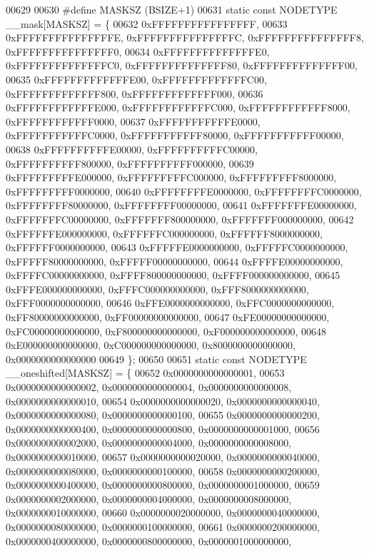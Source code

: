 \begin{DoxyCode}
00629 
00630 \textcolor{preprocessor}{#define MASKSZ (BSIZE+1)}
00631 \textcolor{keyword}{static} \textcolor{keyword}{const} NODETYPE \_\_mask[MASKSZ] = \{
00632         0xFFFFFFFFFFFFFFFF,
00633         0xFFFFFFFFFFFFFFFE, 0xFFFFFFFFFFFFFFFC, 0xFFFFFFFFFFFFFFF8, 0xFFFFFFFFFFFFFFF0,
00634         0xFFFFFFFFFFFFFFE0, 0xFFFFFFFFFFFFFFC0, 0xFFFFFFFFFFFFFF80, 0xFFFFFFFFFFFFFF00,
00635         0xFFFFFFFFFFFFFE00, 0xFFFFFFFFFFFFFC00, 0xFFFFFFFFFFFFF800, 0xFFFFFFFFFFFFF000,
00636         0xFFFFFFFFFFFFE000, 0xFFFFFFFFFFFFC000, 0xFFFFFFFFFFFF8000, 0xFFFFFFFFFFFF0000,
00637         0xFFFFFFFFFFFE0000, 0xFFFFFFFFFFFC0000, 0xFFFFFFFFFFF80000, 0xFFFFFFFFFFF00000,
00638         0xFFFFFFFFFFE00000, 0xFFFFFFFFFFC00000, 0xFFFFFFFFFF800000, 0xFFFFFFFFFF000000,
00639         0xFFFFFFFFFE000000, 0xFFFFFFFFFC000000, 0xFFFFFFFFF8000000, 0xFFFFFFFFF0000000,
00640         0xFFFFFFFFE0000000, 0xFFFFFFFFC0000000, 0xFFFFFFFF80000000, 0xFFFFFFFF00000000,
00641         0xFFFFFFFE00000000, 0xFFFFFFFC00000000, 0xFFFFFFF800000000, 0xFFFFFFF000000000,
00642         0xFFFFFFE000000000, 0xFFFFFFC000000000, 0xFFFFFF8000000000, 0xFFFFFF0000000000,
00643         0xFFFFFE0000000000, 0xFFFFFC0000000000, 0xFFFFF80000000000, 0xFFFFF00000000000,
00644         0xFFFFE00000000000, 0xFFFFC00000000000, 0xFFFF800000000000, 0xFFFF000000000000,
00645         0xFFFE000000000000, 0xFFFC000000000000, 0xFFF8000000000000, 0xFFF0000000000000,
00646         0xFFE0000000000000, 0xFFC0000000000000, 0xFF80000000000000, 0xFF00000000000000,
00647         0xFE00000000000000, 0xFC00000000000000, 0xF800000000000000, 0xF000000000000000,
00648         0xE000000000000000, 0xC000000000000000, 0x8000000000000000, 0x0000000000000000
00649 \};
00650 
00651 \textcolor{keyword}{static} \textcolor{keyword}{const} NODETYPE \_\_oneshifted[MASKSZ] = \{
00652         0x0000000000000001,
00653         0x0000000000000002, 0x0000000000000004, 0x0000000000000008, 0x0000000000000010,
00654         0x0000000000000020, 0x0000000000000040, 0x0000000000000080, 0x0000000000000100,
00655         0x0000000000000200, 0x0000000000000400, 0x0000000000000800, 0x0000000000001000,
00656         0x0000000000002000, 0x0000000000004000, 0x0000000000008000, 0x0000000000010000,
00657         0x0000000000020000, 0x0000000000040000, 0x0000000000080000, 0x0000000000100000,
00658         0x0000000000200000, 0x0000000000400000, 0x0000000000800000, 0x0000000001000000,
00659         0x0000000002000000, 0x0000000004000000, 0x0000000008000000, 0x0000000010000000,
00660         0x0000000020000000, 0x0000000040000000, 0x0000000080000000, 0x0000000100000000,
00661         0x0000000200000000, 0x0000000400000000, 0x0000000800000000, 0x0000001000000000,

\end{DoxyCode}
